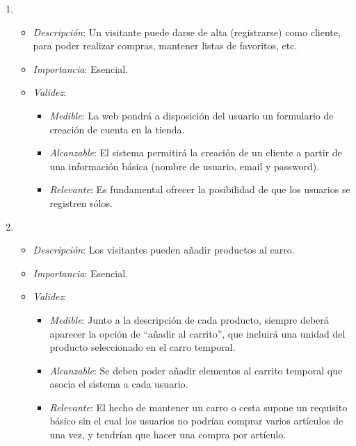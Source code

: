 \begin{enumerate}[{\bf RF-1}]
\item 
  \begin{itemize}
  \item \textit{Descripción}: Un visitante puede darse de alta (registrarse) como cliente, para poder realizar compras, mantener listas de favoritos, etc.
  \item \textit{Importancia}: Esencial.
  \item \textit{Validez}:
    \begin{itemize}
    \item \textit{Medible}: La web pondrá a disposición del usuario un formulario de creación de cuenta en la tienda.
    \item \textit{Alcanzable}: El sistema permitirá la creación de un cliente a partir de una información básica (nombre de usuario, email y password).
    \item \textit{Relevante}: Es fundamental ofrecer la posibilidad de que los usuarios se registren sólos.
    \end{itemize}
  \end{itemize}


\item 
  \begin{itemize}
  \item \textit{Descripción}: Los visitantes pueden añadir productos al carro.
  \item \textit{Importancia}: Esencial.
  \item \textit{Validez}:
    \begin{itemize}
    \item \textit{Medible}: Junto a la descripción de cada producto, siempre deberá aparecer la opción de ``añadir al carrito'', que incluirá una unidad del producto seleccionado en el carro temporal.
    \item \textit{Alcanzable}: Se deben poder añadir elementos al carrito temporal que asocia el sistema a cada usuario.
    \item \textit{Relevante}: El hecho de mantener un carro o cesta supone un requisito básico sin el cual los usuarios no podrían comprar varios artículos de una vez, y tendrían que hacer una compra por artículo.
    \end{itemize}
  \end{itemize}



\end{enumerate}
